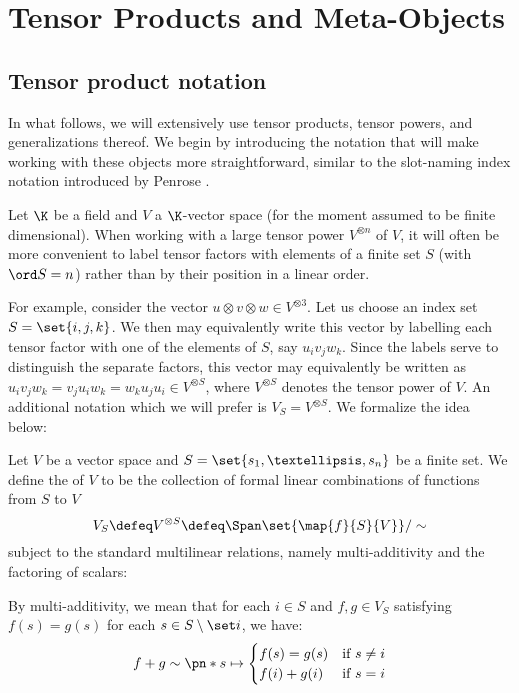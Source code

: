 \chapter{Tensor Products and Meta-Objects}
\label{ch:intro}

\section{Tensor product notation}
In what follows, we will extensively use tensor products, tensor powers, and
generalizations thereof. We begin by introducing the notation that will
make working with these objects more straightforward, similar to the slot-naming
index notation introduced by Penrose \cite{penrose}.

Let $\K$ be a field and $V$ a $\K$-vector space (for the moment assumed to be
finite dimensional). When working with a large tensor power $V^{\otimes n}$ of
$V$, it will often be more convenient to label tensor factors with elements of a
finite set $S$ (with $\ord S = n$) rather than by their position in a linear
order.

For example, consider the vector $u \otimes v \otimes w \in V^{\otimes 3}$. Let
us choose an index set $S = \set{i,j,k}$. We then may equivalently write this
vector by labelling each tensor factor with one of the elements of $S$, say
$u_iv_jw_k$. Since the labels serve to distinguish the separate factors, this
vector may equivalently be written as $u_iv_jw_k = v_ju_iw_k = w_ku_ju_i \in
V^{\otimes S}$, where $V^{\otimes S}$ denotes the tensor power of $V$. An
additional notation which we will prefer is $V_S = V^{\otimes S}$. We formalize
the idea below:

\begin{definition}\label{def:indexed_tensor_powers}
        Let $V$ be a vector space and $S = \set{s_1,…, s_n}$ be a finite
        set. We define the  of $V$ to be the
        collection of formal linear combinations of functions from $S$ to $V$
        \begin{equation}\label{eq:indexed_tensor}
                V_S \defeq V^{\otimes S} \defeq \Span\set{\map {f} {S} {V}}/\sim
        \end{equation}
        subject to the standard multilinear relations, namely multi-additivity
        and the factoring of scalars:

        By multi-additivity, we mean that for each $i\in S$ and $f, g \in V_S$
        satisfying $f(s) = g(s)$ for each $s \in S\setminus\set i$, we have:
        \begin{equation}
                \label{eq:tensor_additive}
                f + g\sim \pn*{
                        s \mapsto
                        \begin{cases}
                                f(s) = g(s) & \text{if $s \neq i$}\\
                                f(i) + g(i) & \text{if $s = i$}
                        \end{cases}
                }
        \end{equation}
\end{definition}

